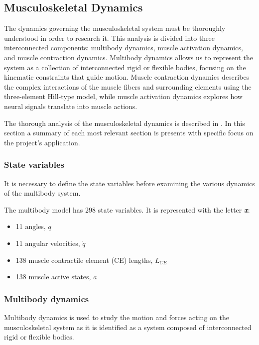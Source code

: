 \subsection{Musculoskeletal Dynamics}
The dynamics governing the musculoskeletal system must be thoroughly understood in order to research it. This analysis is divided into three interconnected components: multibody dynamics, muscle activation dynamics, and muscle contraction dynamics. Multibody dynamics allows us to represent the system as a collection of interconnected rigid or flexible bodies, focusing on the kinematic constraints that guide motion. Muscle contraction dynamics describes the complex interactions of the muscle fibers and surrounding elements using the three-element Hill-type model, while muscle activation dynamics explores how neural signals translate into muscle actions.

The thorough analysis of the musculoskeletal dynamics is described in \cite{IMP}. In this section a summary of each most relevant section is presents with specific focus on the project's application.


\subsubsection{State variables}\label{state}

It is necessary to define the state variables before examining the various dynamics of the multibody system.

The multibody model has 298 state variables. It is represented with the letter\textbf{ \textit{x}}:
\begin{itemize}
    \item 11 angles, $q$
    \item 11 angular velocities, $\dot{q}$
    \item 138 muscle contractile element (CE) lengths, $L_{CE}$
    \item 138 muscle active states, $a$
\end{itemize}

 
\subsubsection{Multibody dynamics}

Multibody dynamics is used to study the motion and forces acting on the musculoskeletal system as it is identified as a system composed of interconnected rigid or flexible bodies. 

